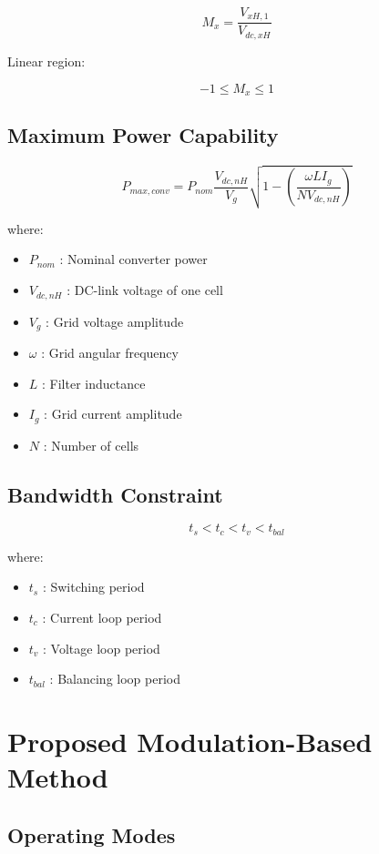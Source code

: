\documentclass[11pt]{article}
\begin{document}
\begin{equation}
M_x = \frac{V_{xH,1}}{V_{dc,xH}}
\end{equation}

Linear region:

\[
-1 \le M_x \le 1
\]

\subsection{Maximum Power Capability}

\begin{equation}
P_{max,conv} =
P_{nom}
\frac{V_{dc,nH}}{V_g}
\sqrt{
1 -
\left(
\frac{\omega L I_g}{N V_{dc,nH}}
\right)
}
\end{equation}

where:

\begin{itemize}
\item $P_{nom}$ : Nominal converter power
\item $V_{dc,nH}$ : DC-link voltage of one cell
\item $V_g$ : Grid voltage amplitude
\item $\omega$ : Grid angular frequency
\item $L$ : Filter inductance
\item $I_g$ : Grid current amplitude
\item $N$ : Number of cells
\end{itemize}

\subsection{Bandwidth Constraint}

\[
t_s < t_c < t_v < t_{bal}
\]

where:

\begin{itemize}
\item $t_s$ : Switching period
\item $t_c$ : Current loop period
\item $t_v$ : Voltage loop period
\item $t_{bal}$ : Balancing loop period
\end{itemize}

\section{Proposed Modulation-Based Method}

\subsection{Operating Modes}
\end{document}
